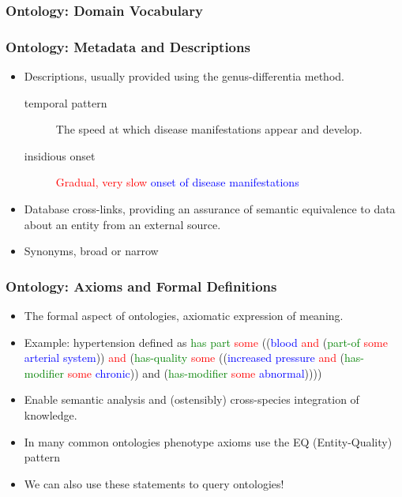 \documentclass[aspectratio=169]{beamer} %
\begin{document}
\begin{frame}
\frametitle{Ontology: Domain Vocabulary}
\end{frame}

\begin{frame}
\frametitle{Ontology: Metadata and Descriptions}

\begin{itemize}
  \item Descriptions, usually provided using the genus-differentia method.
  \begin{description}
    \item[temporal pattern] The speed at which disease
    manifestations appear and develop.
    \item[insidious onset] \textcolor{red}{Gradual, very slow}
    \textcolor{blue}{onset of disease manifestations}
  \end{description}
  \item Database cross-links, providing an assurance of semantic equivalence to
  data about an entity from an external source.
  \item Synonyms, broad or narrow
\end{itemize}
\end{frame}

\begin{frame}
\frametitle{Ontology: Axioms and Formal Definitions}

\begin{itemize}
  \item The formal aspect of ontologies, axiomatic expression of meaning.
  \item Example: hypertension defined as \textcolor{green}{has part}
  \textcolor{red}{some} ((\textcolor{blue}{blood} \textcolor{red}{and}
  (\textcolor{green}{part-of} \textcolor{red}{some} \textcolor{blue}{arterial
  system})) \textcolor{red}{and} (\textcolor{green}{has-quality}
  \textcolor{red}{some}
  ((\textcolor{blue}{increased pressure} \textcolor{red}{and}
  (\textcolor{green}{has-modifier} \textcolor{red}{some}
  \textcolor{blue}{chronic})) and (\textcolor{green}{has-modifier}
  \textcolor{red}{some}
  \textcolor{blue}{abnormal}))))
  \item Enable semantic analysis and (ostensibly) cross-species integration of
  knowledge.
  \item In many common ontologies phenotype axioms use the EQ (Entity-Quality) pattern
  \item We can also use these statements to query ontologies!
\end{itemize}
\end{frame}
\end{document}

